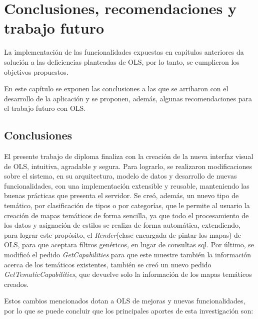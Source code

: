 
\chapter{Conclusiones, recomendaciones y trabajo futuro}
La implementaci\'on de las funcionalidades expuestas en cap\'itulos anteriores da soluci\'on a las deficiencias planteadas de OLS, por lo tanto, se cumplieron los objetivos propuestos. 

En este cap\'itulo se exponen las conclusiones a las que se arribaron con el desarrollo de la aplicaci\'on y se proponen, adem\'as, algunas recomendaciones para el trabajo futuro con OLS.

\section{Conclusiones}
El presente trabajo de diploma finaliza con la creaci\'on de la nueva interfaz visual de OLS, intuitiva, agradable y segura. Para lograrlo, se realizaron modificaciones sobre el sistema, en su arquitectura, modelo de datos y desarrollo de nuevas funcionalidades, con una implementaci\'on extensible y reusable, manteniendo las buenas pr\'acticas que presenta el servidor. Se cre\'o, adem\'as, un nuevo tipo de tem\'atico, por clasificaci\'on de tipos o por categor\'ias, que le permite al usuario la creaci\'on de mapas tem\'aticos de forma sencilla, ya que todo el procesamiento de los datos y asignaci\'on de estilos se realiza de forma autom\'atica,  extendiendo, para lograr este prop\'osito, el \textit{Render}(clase encargada de pintar los mapas) de OLS, para que aceptara filtros gen\'ericos, en lugar de consultas sql. Por \'ultimo, se modific\'o el pedido \textit{GetCapabilities} para que este muestre tambi\'en la informaci\'on acerca de los tem\'aticos existentes, tambi\'en se cre\'o un nuevo pedido \textit{GetTematicCapabilities}, que devuelve solo la informaci\'on de los mapas tem\'aticos creados.

Estos cambios mencionados dotan a OLS de mejoras y nuevas funcionalidades, por lo que se puede concluir que los principales aportes de esta investigaci\'on son:

